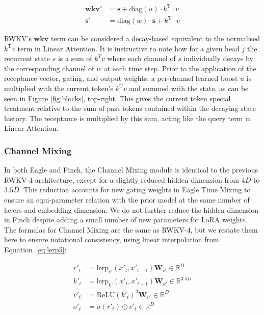 \begin{align}
\label{eq:time-mixer5}
\bm{wkv}' &= \bm{s} + \mathrm{diag}(u) \cdot k^\mathrm{T} \cdot v \\
\label{eq:time-mixer5state}
\bm{s}' &= \mathrm{diag}(w) \cdot \bm{s} + k^\mathrm{T} \cdot v
\end{align}

RWKV's $\bm{wkv}$ term can be considered a decay-based equivalent to the normalised $k^\mathrm{T}v$ term in Linear Attention. It is instructive to note how for a given head $j$ the recurrent state $s$ is a sum of $k^Tv$ where each channel of $s$ individually decays by the corresponding channel of $w$ at each time step. Prior to the application of the receptance vector, gating, and output weights, a per-channel learned boost $u$ is multiplied with the current token's $k^\mathrm{T}v$ and summed with the state, as can be seen in \hyperref[fig:blocks]{Figure \ref*{fig:blocks}}, top-right. This gives the current token special treatment relative to the sum of past tokens contained within the decaying state history. The receptance is multiplied by this sum, acting like the query term in Linear Attention.

\subsubsection{Channel Mixing} In both Eagle and Finch, the Channel Mixing module is identical to the previous RWKV-4 architecture, except for a slightly reduced hidden dimension from $4D$ to $3.5D$. This reduction accounts for new gating weights in Eagle Time Mixing to ensure an equi-parameter relation with the prior model at the same number of layers and embedding dimension. We do not further reduce the hidden dimension in Finch despite adding a small number of new parameters for LoRA weights. The formulas for Channel Mixing are the same as RWKV-4, but we restate them here to ensure notational consistency, using linear interpolation from Equation~\ref{eq:lerp5}:

\begin{align}
\label{eq:channel-mix5}
r'_t &= \mathrm{lerp}_{r'} (x'_t, x'_{t-1}) \bm{W}_{r'}\in \mathbb{R}^{D}\\
k'_t &= \mathrm{lerp}_{k'} (x'_t, x'_{t-1}) \bm{W}_{k'}\in \mathbb{R}^{3.5D}\\
v'_t &= \mathrm{ReLU}(k'_t)^2 \bm{W}_{v'}\in \mathbb{R}^{D}\\ 
o'_t &= \sigma(r'_t) \odot v'_t\in \mathbb{R}^{D}
\end{align}

